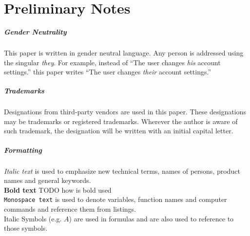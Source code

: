\clearpage
\chapter*{Preliminary Notes}
\label{chap:prenotes}
\thispagestyle{scrheadings}

\paragraph{Gender Neutrality}
This paper is written in gender neutral language.
Any person is addressed using the singular \emph{they}.
For example, instead of
``The user changes \emph{his} account settings.''
this paper writes
``The user changes \emph{their} account settings.''


\paragraph{Trademarks}
Designations from third-party vendors are used in this paper.
These designations may be trademarks or registered trademarks.
Wherever the author is aware of such trademark,
the designation will be written with an initial capital letter.

\paragraph{Formatting}
\emph{Italic text} is used to emphasize new technical terms, names of persons, product names and general keywords.\\ 
\textbf{Bold text} TODO how is bold used \\ 
\texttt{Monospace text} is used to denote variables,  function names and computer commands and reference them from listings.\\
Italic Symbols (e.g. $A$) are used in formulas and are also used to reference to those symbols.
